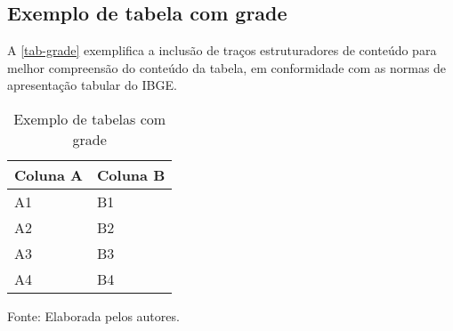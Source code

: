 \begin{apendicesenv}
\chapter{Exemplo de tabela com grade}
A \autoref{tab-grade} exemplifica a inclusão de traços estruturadores de conteúdo para melhor compreensão do conteúdo da tabela, em conformidade com as normas de apresentação tabular do IBGE.
\begin{table}[htb]
\ABNTEXfontereduzida
\caption[Exemplo de tabelas com grade]{Exemplo de tabelas com grade}
\label{tab-grade}
\begin{tabular}{ >{\centering\arraybackslash}m{8cm} | >{\centering\arraybackslash}m{6cm} }
\hline
 \centering \textbf{Coluna A} & \textbf{Coluna B}\\
\hline
  A1 & B1\\
\hline
  A2 & B2\\
\hline
  A3 & B3\\
\hline
  A4 & B4\\
\hline
\end{tabular}
\begin{flushleft}
		Fonte: Elaborada pelos autores.\
\end{flushleft}
\end{table}


\end{apendicesenv}
